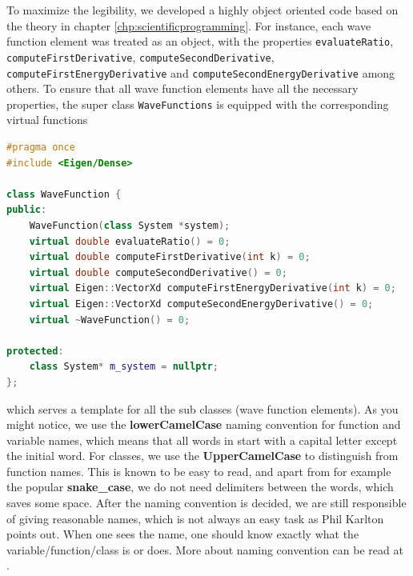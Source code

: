 To maximize the legibility, we developed a highly object oriented code based on the theory in chapter \eqref{chp:scientificprogramming}. For instance, each wave function element was treated as an object, with the properties \texttt{evaluateRatio}, \texttt{computeFirstDerivative}, \texttt{computeSecondDerivative}, \texttt{computeFirstEnergyDerivative} and \texttt{computeSecondEnergyDerivative} among others. To ensure that all wave function elements have all the necessary properties, the super class \texttt{WaveFunctions} is equipped with the corresponding virtual functions
\lstset{basicstyle=\scriptsize}
\begin{lstlisting}[language=c++,caption={Simplification of \texttt{wavefunction.h}}]
#pragma once
#include <Eigen/Dense>

class WaveFunction {
public:
	WaveFunction(class System *system);
	virtual double evaluateRatio() = 0;
	virtual double computeFirstDerivative(int k) = 0;
	virtual double computeSecondDerivative() = 0;
	virtual Eigen::VectorXd computeFirstEnergyDerivative(int k) = 0;
	virtual Eigen::VectorXd computeSecondEnergyDerivative() = 0;
	virtual ~WaveFunction() = 0;

protected:
	class System* m_system = nullptr;
};
\end{lstlisting}
which serves a template for all the sub classes (wave function elements). As you might notice, we use the \textbf{lowerCamelCase} naming convention for function and variable names, which means that all words in start with a capital letter except the initial word. For classes, we use the \textbf{UpperCamelCase} to distinguish from function names. This is known to be easy to read, and apart from for example the popular \textbf{snake\_case}, we do not need delimiters between the words, which saves some space. After the naming convention is decided, we are still responsible of giving reasonable names, which is not always an easy task as Phil Karlton points out. When one sees the name, one should know exactly what the variable/function/class is or does. More about naming convention can be read at \cite{noauthor_naming_2019}.

